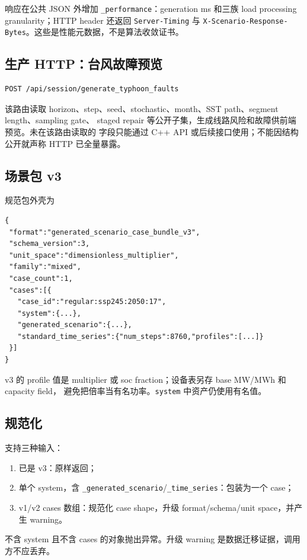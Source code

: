 响应在公共 JSON 外增加 \texttt{\_performance}：generation ms 和三族 load processing
granularity；HTTP header 还返回 \texttt{Server-Timing} 与
\texttt{X-Scenario-Response-Bytes}。这些是性能元数据，不是算法收敛证书。

\subsection{生产 HTTP：台风故障预览}
\begin{verbatim}
POST /api/session/generate_typhoon_faults
\end{verbatim}
该路由读取 horizon、step、seed、stochastic、month、SST path、segment length、sampling gate、
staged repair 等公开子集，生成线路风险和故障供前端预览。未在该路由读取的
 字段只能通过 C++ API 或后续接口使用；不能因结构公开就声称 HTTP
已全量暴露。

\subsection{场景包 v3}
规范包外壳为
\begin{verbatim}
{
 "format":"generated_scenario_case_bundle_v3",
 "schema_version":3,
 "unit_space":"dimensionless_multiplier",
 "family":"mixed",
 "case_count":1,
 "cases":[{
   "case_id":"regular:ssp245:2050:17",
   "system":{...},
   "generated_scenario":{...},
   "standard_time_series":{"num_steps":8760,"profiles":[...]}
 }]
}
\end{verbatim}
v3 的 profile 值是 multiplier 或 soc fraction；设备表另存 base MW/MWh 和 capacity field，
避免把倍率当有名功率。\texttt{system} 中资产仍使用有名值。

\subsection{规范化}
 支持三种输入：
\begin{enumerate}
  \item 已是 v3：原样返回；
  \item 单个 system，含 \texttt{\_generated\_scenario}/\texttt{\_time\_series}：包装为一个 case；
  \item v1/v2 cases 数组：规范化 case shape，升级 format/schema/unit space，并产生 warning。
\end{enumerate}
不含 system 且不含 cases 的对象抛出异常。升级 warning 是数据迁移证据，调用方不应丢弃。

